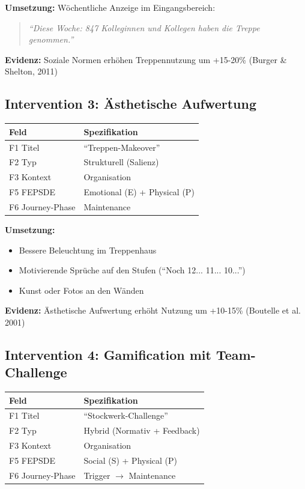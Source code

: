 \documentclass[11pt,a4paper]{article}
\begin{document}
\textbf{Umsetzung:} Wöchentliche Anzeige im Eingangsbereich:
\begin{quote}
\textit{``Diese Woche: 847 Kolleginnen und Kollegen haben die Treppe genommen.''}
\end{quote}

\textbf{Evidenz:} Soziale Normen erhöhen Treppennutzung um +15-20\% (Burger \& Shelton, 2011)

\subsection{Intervention 3: Ästhetische Aufwertung}

\begin{table}[h]
\centering
\begin{tabular}{ll}
\toprule
\textbf{Feld} & \textbf{Spezifikation} \\
\midrule
F1 Titel & ``Treppen-Makeover'' \\
F2 Typ & Strukturell (Salienz) \\
F3 Kontext & Organisation \\
F5 FEPSDE & Emotional (E) + Physical (P) \\
F6 Journey-Phase & Maintenance \\
\bottomrule
\end{tabular}
\end{table}

\textbf{Umsetzung:}
\begin{itemize}
    \item Bessere Beleuchtung im Treppenhaus
    \item Motivierende Sprüche auf den Stufen (``Noch 12... 11... 10...'')
    \item Kunst oder Fotos an den Wänden
\end{itemize}

\textbf{Evidenz:} Ästhetische Aufwertung erhöht Nutzung um +10-15\% (Boutelle et al. 2001)

\subsection{Intervention 4: Gamification mit Team-Challenge}

\begin{table}[h]
\centering
\begin{tabular}{ll}
\toprule
\textbf{Feld} & \textbf{Spezifikation} \\
\midrule
F1 Titel & ``Stockwerk-Challenge'' \\
F2 Typ & Hybrid (Normativ + Feedback) \\
F3 Kontext & Organisation \\
F5 FEPSDE & Social (S) + Physical (P) \\
F6 Journey-Phase & Trigger $\rightarrow$ Maintenance \\
\bottomrule
\end{tabular}
\end{table}
\end{document}
